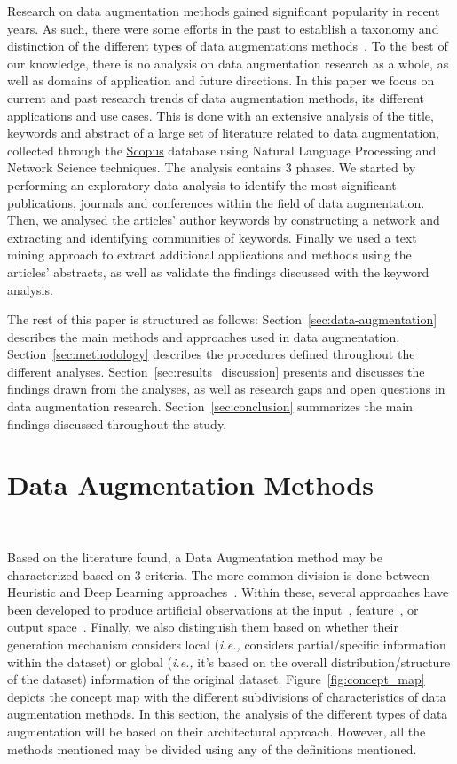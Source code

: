 \documentclass[parskip=full]{scrartcl}
\begin{document}
Research on data augmentation methods gained significant popularity in recent
years. As such, there were some efforts in the past to establish a taxonomy
and distinction of the different types of data augmentations
methods~\cite{Shorten2019}. To the best of our knowledge, there is no analysis
on data augmentation research as a whole, as well as domains of application
and future directions. In this paper we focus on current and past research
trends of data augmentation methods, its different applications and use cases.
This is done with an extensive analysis of the title, keywords and abstract of
a large set of literature related to data augmentation, collected through the
\href{https://www.scopus.com/}{Scopus} database using Natural Language
Processing and Network Science techniques. The analysis contains 3 phases. We
started by performing an exploratory data analysis to identify the most
significant publications, journals and conferences within the field of data
augmentation. Then, we analysed the articles' author keywords by constructing
a network and extracting and identifying communities of keywords.  Finally we
used a text mining approach to extract additional applications and methods
using the articles' abstracts, as well as validate the findings discussed with
the keyword analysis.

The rest of this paper is structured as follows:
Section~\ref{sec:data-augmentation} describes the main methods and approaches
used in data augmentation, Section~\ref{sec:methodology} describes the
procedures defined throughout the different analyses.
Section~\ref{sec:results_discussion} presents and discusses the findings drawn
from the analyses, as well as research gaps and open questions in data
augmentation research. Section~\ref{sec:conclusion} summarizes the main
findings discussed throughout the study.

\section{Data Augmentation Methods}~\label{sec:data-augmentation}
 
Based on the literature found, a Data Augmentation method may be characterized
based on 3 criteria. The more common division is done between Heuristic and
Deep Learning approaches~\cite{Shorten2019}. Within these, several approaches
have been developed to produce artificial observations at the
input~\cite{Zhong2017}, feature~\cite{DeVries2017}, or output
space~\cite{Behpour2019}. Finally, we also distinguish them based on whether
their generation mechanism considers local (\textit{i.e.,} considers
partial/specific information within the dataset) or global (\textit{i.e.,}
it's based on the overall distribution/structure of the dataset) information
of the original dataset. Figure~\ref{fig:concept_map} depicts the concept map
with the different subdivisions of characteristics of data augmentation
methods. In this section, the analysis of the different types of data
augmentation will be based on their architectural approach. However, all the
methods mentioned may be divided using any of the definitions mentioned.
\end{document}
